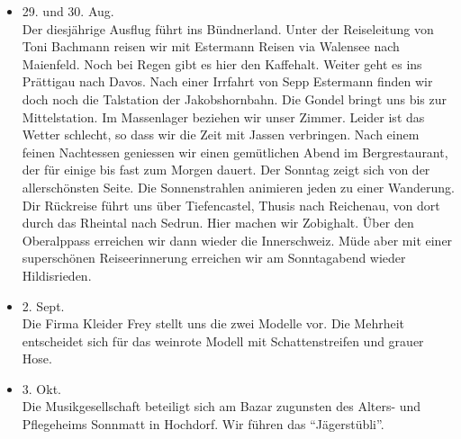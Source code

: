 \begin{history}
\begin{itemize}
        \item 29. und 30. Aug.\\
              Der diesjährige Ausflug führt ins Bündnerland. Unter der Reiseleitung
              von Toni Bachmann reisen wir mit Estermann Reisen via Walensee nach
              Maienfeld. Noch bei Regen gibt es hier den Kaffehalt. Weiter geht es ins
              Prättigau nach Davos. Nach einer Irrfahrt von Sepp Estermann finden wir
              doch noch die Talstation der Jakobshornbahn. Die Gondel bringt uns bis
              zur Mittelstation. Im Massenlager beziehen wir unser Zimmer. Leider ist
              das Wetter schlecht, so dass wir die Zeit mit Jassen verbringen. Nach
              einem feinen Nachtessen geniessen wir einen gemütlichen Abend im
              Bergrestaurant, der für einige bis fast zum Morgen dauert. Der Sonntag
              zeigt sich von der allerschönsten Seite. Die Sonnenstrahlen animieren
              jeden zu einer Wanderung. Dir Rückreise führt uns über Tiefencastel,
              Thusis nach Reichenau, von dort durch das Rheintal nach Sedrun. Hier
              machen wir Zobighalt. Über den Oberalppass erreichen wir dann wieder die
              Innerschweiz. Müde aber mit einer superschönen Reiseerinnerung erreichen
              wir am Sonntagabend wieder Hildisrieden.

        \item 2. Sept.\\
              Die Firma Kleider Frey stellt uns die zwei Modelle vor. Die Mehrheit
              entscheidet sich für das weinrote Modell mit Schattenstreifen und grauer
              Hose.

        \item 3. Okt.\\
              Die Musikgesellschaft beteiligt sich am Bazar zugunsten des Alters- und
              Pflegeheims Sonnmatt in Hochdorf. Wir führen das \enquote{Jägerstübli}.


    \end{itemize}

\end{history}
